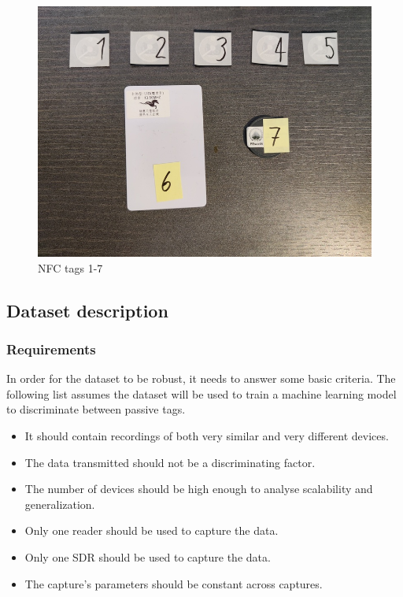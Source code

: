 \begin{figure}[htp!]
  \centering
  \includegraphics[scale=0.35]{figures/data_standard-tags2.jpg}
  \caption{NFC tags 1-7}
  \label{fig:tags}
\end{figure}

\subsection{Dataset description}

\subsubsection{Requirements}

In order for the dataset to be robust, it needs to answer some basic criteria. The following list assumes the dataset will be used to train a machine learning model to discriminate between passive tags.

\begin{itemize}
  \item It should contain recordings of both very similar and very different devices.
  \item The data transmitted should not be a discriminating factor.
  \item The number of devices should be high enough to analyse scalability and generalization.
  \item Only one reader should be used to capture the data.
  \item Only one SDR should be used to capture the data.
  \item The capture's parameters should be constant across captures.
\end{itemize}

